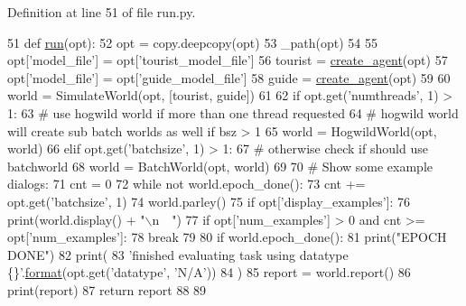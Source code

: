 Definition at line 51 of file run.\+py.


\begin{DoxyCode}
51 \textcolor{keyword}{def }\hyperlink{namespaceparlai_1_1tasks_1_1talkthewalk_1_1run_a0a1ec08b8196cb008e4df83468c67e5b}{run}(opt):
52     opt = copy.deepcopy(opt)
53     \_path(opt)
54 
55     opt[\textcolor{stringliteral}{'model\_file'}] = opt[\textcolor{stringliteral}{'tourist\_model\_file'}]
56     tourist = \hyperlink{namespaceparlai_1_1core_1_1agents_ad0d54074d4bcc148bb415ab5515a53b5}{create\_agent}(opt)
57     opt[\textcolor{stringliteral}{'model\_file'}] = opt[\textcolor{stringliteral}{'guide\_model\_file'}]
58     guide = \hyperlink{namespaceparlai_1_1core_1_1agents_ad0d54074d4bcc148bb415ab5515a53b5}{create\_agent}(opt)
59 
60     world = SimulateWorld(opt, [tourist, guide])
61 
62     \textcolor{keywordflow}{if} opt.get(\textcolor{stringliteral}{'numthreads'}, 1) > 1:
63         \textcolor{comment}{# use hogwild world if more than one thread requested}
64         \textcolor{comment}{# hogwild world will create sub batch worlds as well if bsz > 1}
65         world = HogwildWorld(opt, world)
66     \textcolor{keywordflow}{elif} opt.get(\textcolor{stringliteral}{'batchsize'}, 1) > 1:
67         \textcolor{comment}{# otherwise check if should use batchworld}
68         world = BatchWorld(opt, world)
69 
70     \textcolor{comment}{# Show some example dialogs:}
71     cnt = 0
72     \textcolor{keywordflow}{while} \textcolor{keywordflow}{not} world.epoch\_done():
73         cnt += opt.get(\textcolor{stringliteral}{'batchsize'}, 1)
74         world.parley()
75         \textcolor{keywordflow}{if} opt[\textcolor{stringliteral}{'display\_examples'}]:
76             print(world.display() + \textcolor{stringliteral}{"\(\backslash\)n~~"})
77         \textcolor{keywordflow}{if} opt[\textcolor{stringliteral}{'num\_examples'}] > 0 \textcolor{keywordflow}{and} cnt >= opt[\textcolor{stringliteral}{'num\_examples'}]:
78             \textcolor{keywordflow}{break}
79 
80     \textcolor{keywordflow}{if} world.epoch\_done():
81         print(\textcolor{stringliteral}{"EPOCH DONE"})
82     print(
83         \textcolor{stringliteral}{'finished evaluating task using datatype \{\}'}.\hyperlink{namespaceparlai_1_1chat__service_1_1services_1_1messenger_1_1shared__utils_a32e2e2022b824fbaf80c747160b52a76}{format}(opt.get(\textcolor{stringliteral}{'datatype'}, \textcolor{stringliteral}{'N/A'}))
84     )
85     report = world.report()
86     print(report)
87     \textcolor{keywordflow}{return} report
88 
89 
\end{DoxyCode}
\mbox{\label{namespaceparlai_1_1tasks_1_1talkthewalk_1_1run_a3534e8afa0a4dc25a6e02740fa35ac84}} 
